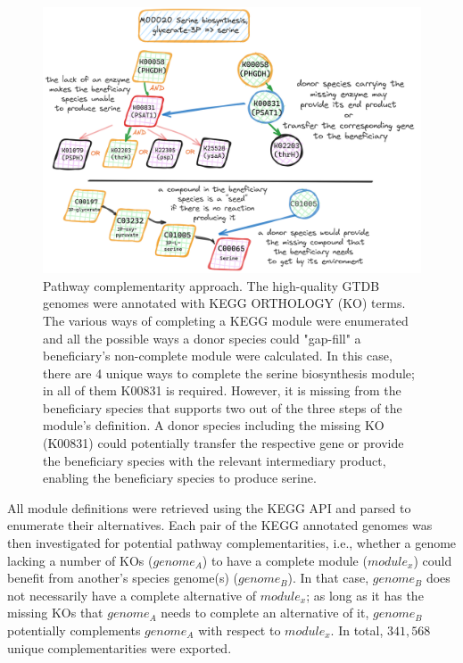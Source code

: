 \documentclass[sn-mathphys,Numbered]{sn-jnl}  %
\theoremstyle{thmstyleone}%
\theoremstyle{thmstyletwo}%
\theoremstyle{thmstylethree}%
\begin{document}
        \begin{figure}[h!]
            \includegraphics*[width=0.8\columnwidth]{figs/path_complem.png}
            \caption{
                Pathway complementarity approach. 
                The high-quality GTDB genomes were annotated with KEGG ORTHOLOGY (KO) terms.
                The various ways of completing a KEGG module were enumerated and all the possible ways a donor species could "gap-fill" a beneficiary's non-complete module were calculated.
                In this case, there are 4 unique ways to complete the serine biosynthesis module; in all of them K00831 is required.
                However, it is missing from the beneficiary species that supports two out of the three steps of the module's definition.
                A donor species including the missing KO (K00831) could potentially transfer the respective gene or provide the beneficiary species with the relevant intermediary product, enabling the beneficiary species to produce serine.
            }
            \label{fig:pathcompl}
        \end{figure}

        All module definitions were retrieved using the KEGG API and parsed to enumerate their alternatives.
        Each pair of the KEGG annotated genomes was then investigated for potential pathway complementarities, 
        i.e., whether a genome lacking a number of KOs ($genome_A$) to have a complete module ($module_x$) could benefit from another's species genome(s) ($genome_B$).
        In that case, $genome_B$ does not necessarily have a complete alternative of $module_x$; as long as it has the missing KOs that $genome_A$ needs to complete an alternative of it, $genome_B$ potentially complements $genome_A$ with respect to $module_x$.
        In total, $341,568$ unique complementarities were exported.
\end{document}
